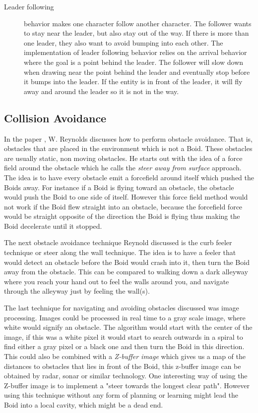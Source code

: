 \begin{description}
\item [Leader following] behavior makes one character follow another character. The follower wants to stay near the leader, but also stay out of the way. If there is more than one leader, they also want to avoid bumping into each other. The implementation of leader following behavior relies on the arrival behavior where the goal is a point behind the leader. The follower will slow down when drawing near the point behind the leader and eventually stop before it bumps into the leader. If the entity is in front of the leader, it will fly away and around the leader so it is not in the way.
\end{description}

\subsection{Collision Avoidance}
In the paper \citep{CraigW.Reynolds}, W. Reynolds discusses how to perform obstacle avoidance. That is, obstacles that are placed in the environment which is not a Boid. These obstacles are usually static, non moving obstacles. He starts out with the idea of a force field around the obstacle which he calls the \textit{steer away from surface} approach. The idea is to have every obstacle emit a forcefield around itself which pushed the Boids away. For instance if a Boid is flying toward an obstacle, the obstacle would push the Boid to one side of itself. However this force field method would not work if the Boid flew straight into an obstacle, because the forcefield force would be straight opposite of the direction the Boid is flying thus making the Boid decelerate until it stopped.

The next obstacle avoidance technique Reynold discussed is the curb feeler technique or steer along the wall technique. The idea is to have a feeler that would detect an obstacle before the Boid would crash into it, then turn the Boid away from the obstacle. This can be compared to walking down a dark alleyway where you reach your hand out to feel the walls around you, and navigate through the alleyway just by feeling the wall(s).

The last technique for navigating and avoiding obstacles discussed was image processing. Images could be processed in real time to a gray scale image, where white would signify an obstacle. The algorithm would start with the center of the image, if this was a white pixel it would start to search outwards in a spiral to find either a gray pixel or a black one and then turn the Boid in this direction. This could also be combined with a \textit{Z-buffer image} which gives us a map of the distances to obstacles that lies in front of the Boid, this z-buffer image can be obtained by radar, sonar or similar technology. One interesting way of using the Z-buffer image is to implement a "steer towards the longest clear path". However using this technique without any form of planning or learning might lead the Boid into a local cavity, which might be a dead end.

